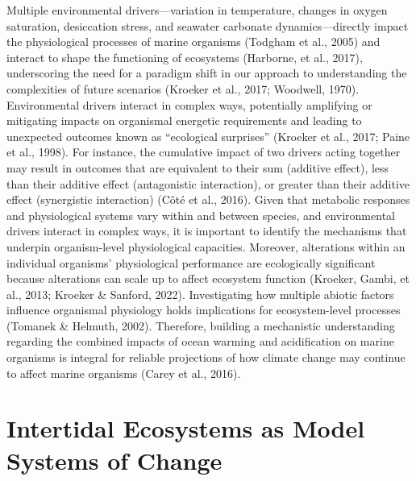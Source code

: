 \documentclass{CSUNthesis}
\begin{document}
Multiple environmental drivers---variation in temperature, changes in oxygen saturation, desiccation stress, and seawater carbonate dynamics---directly impact the physiological processes of marine organisms (Todgham et al., 2005) and interact to shape the functioning of ecosystems (Harborne, et al., 2017), underscoring the need for a paradigm shift in our approach to understanding the complexities of future scenarios (Kroeker et al., 2017; Woodwell, 1970). Environmental drivers interact in complex ways, potentially amplifying or mitigating impacts on organismal energetic requirements and leading to unexpected outcomes known as ``ecological surprises'' (Kroeker et al., 2017; Paine et al., 1998). For instance, the cumulative impact of two drivers acting together may result in outcomes that are equivalent to their sum (additive effect), less than their additive effect (antagonistic interaction), or greater than their additive effect (synergistic interaction) (Côté et al., 2016). Given that metabolic responses and physiological systems vary within and between species, and environmental drivers interact in complex ways, it is important to identify the mechanisms that underpin organism-level physiological capacities. Moreover, alterations within an individual organisms' physiological performance are ecologically significant because alterations can scale up to affect ecosystem function (Kroeker, Gambi, et al., 2013; Kroeker \& Sanford, 2022). Investigating how multiple abiotic factors influence organismal physiology holds implications for ecosystem-level processes (Tomanek \& Helmuth, 2002). Therefore, building a mechanistic understanding regarding the combined impacts of ocean warming and acidification on marine organisms is integral for reliable projections of how climate change may continue to affect marine organisms (Carey et al., 2016).

\section*{Intertidal Ecosystems as Model Systems of Change}\label{intertidal-ecosystems-as-model-systems-of-change}
\end{document}
